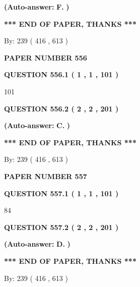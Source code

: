 \documentclass[12pt]{article}
\begin{document}
 
{\textbf{(Auto-answer:}}
{\textbf{\large{
F.}}}
{\textbf{)}}
 
 
   
   
   
   
\vspace{1.0in} 
{\textbf{\large{ *** END OF PAPER, THANKS *** }}} 
   
   
\hspace{1.0in} By: 
 239 ( 416 ,  613 )
   
   
   
   
\newpage 
\setcounter{page}{ 
   556001 } 
   
   
 {\textbf{ \Large{ PAPER NUMBER  556  }}}
   
   
   
   
  
  
{\textbf{\large{QUESTION
556.1 
 ( 1 , 1 , 101 )
}}}

101
  
  
{\textbf{\large{QUESTION
556.2 
 ( 2 , 2 , 201 )
}}}
 
 
{\textbf{(Auto-answer:}}
{\textbf{\large{
C.}}}
{\textbf{)}}
 
 
   
   
   
   
\vspace{1.0in} 
{\textbf{\large{ *** END OF PAPER, THANKS *** }}} 
   
   
\hspace{1.0in} By: 
 239 ( 416 ,  613 )
   
   
   
   
\newpage 
\setcounter{page}{ 
   557001 } 
   
   
 {\textbf{ \Large{ PAPER NUMBER  557  }}}
   
   
   
   
  
  
{\textbf{\large{QUESTION
557.1 
 ( 1 , 1 , 101 )
}}}

84
  
  
{\textbf{\large{QUESTION
557.2 
 ( 2 , 2 , 201 )
}}}
 
 
{\textbf{(Auto-answer:}}
{\textbf{\large{
D.}}}
{\textbf{)}}
 
 
   
   
   
   
\vspace{1.0in} 
{\textbf{\large{ *** END OF PAPER, THANKS *** }}} 
   
   
\hspace{1.0in} By: 
 239 ( 416 ,  613 )
   
   
   
\end{document}
